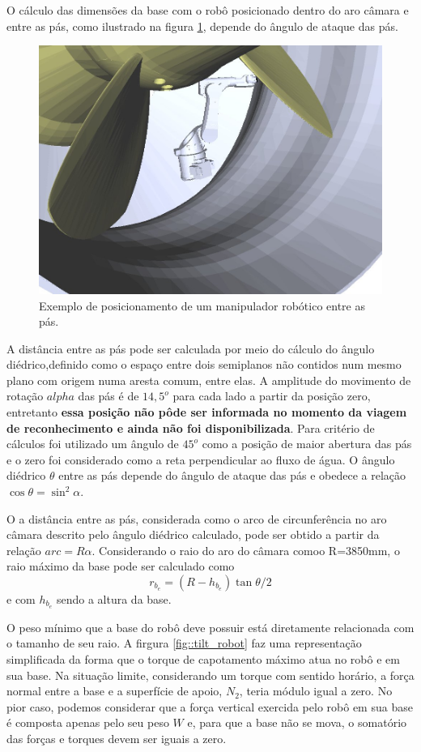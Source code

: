 O cálculo das dimensões da base com o robô posicionado dentro do aro câmara e
entre as pás, como ilustrado na figura \ref{fig::robot_between}, depende do
ângulo de ataque das pás.

\begin{figure}[H]
\centering
	\includegraphics[width=0.7\columnwidth]{sota/figs/openrave/robot_between_openrave.jpg}
	\caption{Exemplo de posicionamento de um manipulador robótico entre as pás.}
	\label{fig::robot_between}
\end{figure}
A distância entre as pás pode ser calculada por meio do cálculo do ângulo
diédrico,definido como o espaço entre dois semiplanos não contidos num mesmo
plano com origem numa aresta comum, entre elas. A amplitude do movimento de
rotação $alpha$ das pás é de $14,5^o$ para cada lado a partir da posição zero,
entretanto \textbf{essa posição não pôde ser informada no momento da viagem de
reconhecimento e ainda não foi disponibilizada}. Para critério de cálculos foi
utilizado um ângulo de $45^o$ como a posição de maior abertura das pás e o zero
foi considerado como a reta perpendicular ao fluxo de água. O ângulo diédrico
$\theta$ entre as pás depende do ângulo de ataque das pás e obedece a relação
$\cos{\theta} = \sin^2{\alpha}.$

O a distância entre as pás, considerada como o arco de circunferência no aro
câmara descrito pelo ângulo diédrico calculado, pode ser obtido a partir da
relação $arc=R\alpha$.
Considerando o raio do aro do câmara comoo R=3850mm, o raio máximo da base pode
ser calculado como $$r_{b_e} = (R - h_{b_e})\tan{\theta/2}$$ e com $h_{b_e}$
sendo a altura da base.

O peso mínimo que a base do robô deve possuir está diretamente relacionada com o
tamanho de seu raio. A firgura \ref{fig::tilt_robot} faz uma representação
simplificada da forma que o torque de capotamento máximo atua no robô e em sua
base. Na situação limite, considerando um torque com sentido horário, a força
normal entre a base e a superfície de apoio, $N_2$, teria módulo igual a zero.
No pior caso, podemos considerar que a força vertical exercida pelo robô em sua
base é composta apenas pelo seu peso $W$ e, para que a base não se mova, o
somatório das forças e torques devem ser iguais a zero.

